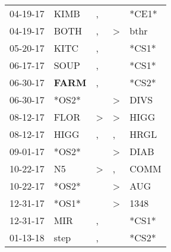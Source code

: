 \begin{supertabular}{p{0.07\textwidth}p{0.06\textwidth}p{0.02\textwidth}p{0.02\textwidth}p{0.06\textwidth}}
          04-19-17\textsuperscript{} &           KIMB\textsuperscript{} &                , &                  &                            *CE1* \\
          04-19-17\textsuperscript{} &           BOTH\textsuperscript{} &                , &     \textgreater &           bthr\textsuperscript{} \\
          05-20-17\textsuperscript{} &           KITC\textsuperscript{} &                , &                  &                            *CS1* \\
          06-17-17\textsuperscript{} &           SOUP\textsuperscript{} &                , &                  &                            *CS1* \\
          06-30-17\textsuperscript{} &  \textbf{FARM\textsuperscript{}} &                , &                  &                            *CS2* \\
          06-30-17\textsuperscript{} &                            *OS2* &                  &     \textgreater &           DIVS\textsuperscript{} \\
          08-12-17\textsuperscript{} &           FLOR\textsuperscript{} &     \textgreater &     \textgreater &           HIGG\textsuperscript{} \\
          08-12-17\textsuperscript{} &           HIGG\textsuperscript{} &                , &                , &           HRGL\textsuperscript{} \\
          09-01-17\textsuperscript{} &                            *OS2* &                  &     \textgreater &           DIAB\textsuperscript{} \\
          10-22-17\textsuperscript{} &             N5\textsuperscript{} &     \textgreater &                , &           COMM\textsuperscript{} \\
          10-22-17\textsuperscript{} &                            *OS2* &                  &     \textgreater &            AUG\textsuperscript{} \\
          12-31-17\textsuperscript{} &                            *OS1* &                  &     \textgreater &           1348\textsuperscript{} \\
          12-31-17\textsuperscript{} &            MIR\textsuperscript{} &                , &                  &                            *CS1* \\
          01-13-18\textsuperscript{} &           step\textsuperscript{} &                , &                  &                            *CS2* \\

\end{supertabular}
